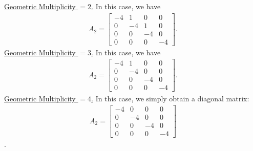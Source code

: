 \documentclass[12pt]{article}
\begin{document}
\begin{enumerate}
	\underline{Geometric Multiplicity $=2$.} In this case, we have
		\begin{align*}
		A_2 = \begin{bmatrix}
		-4 & 1 & 0 & 0 \\
		0 & -4 & 1 & 0 \\
		0 & 0 & -4 & 0 \\
		0 & 0 & 0 & -4
		\end{bmatrix} .
		\end{align*}
	\underline{Geometric Multiplicity $=3$.} In this case, we have
		\begin{align*}
		A_2 = \begin{bmatrix}
		-4 & 1 & 0 & 0 \\
		0 & -4 & 0 & 0 \\
		0 & 0 & -4 & 0 \\
		0 & 0 & 0 & -4
		\end{bmatrix} .
		\end{align*}
	\underline{Geometric Multiplicity $=4$.} In this case, we simply obtain a diagonal matrix:
		\begin{align*}
		A_2 = \begin{bmatrix}
		-4 & 0 & 0 & 0 \\
		0 & -4 & 0 & 0 \\
		0 & 0 & -4 & 0 \\
		0 & 0 & 0 & -4
		\end{bmatrix}
		\end{align*} .
	\end{enumerate}
\end{document}

